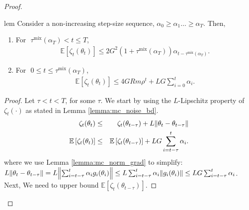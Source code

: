 \documentclass{colt2018} %
\DeclareMathOperator*{\mix}{mix}
\begin{document}
\begin{proof}
\begin{restatable}[]{lem}{}
Consider a non-increasing step-size sequence, $\alpha_0 \geq \alpha_1 \ldots \geq \alpha_T$. Then, 
\label{lemma:grad_bias_bd}
\begin{enumerate}[label=(\alph*)]
\item For $\,\,\tau^{\mix}(\alpha_T) < t \leq T$,
\begin{eqnarray*}
\mathbb{E}\left[\zeta_t(\theta_t)\right] \leq 2G^2 \left(1 + \tau^{\mix}(\alpha_T)\right) \alpha_{t-\tau^{\mix}(\alpha_T)}.
\end{eqnarray*}
\item For $\,\, 0 \leq t \leq \tau^{\mix}(\alpha_T)$,
\begin{eqnarray*}
\mathbb{E}\left[\zeta_t(\theta_t)\right] \leq 4GR m \rho^t + LG \sum_{i=0}^t \alpha_i.
\end{eqnarray*}
\end{enumerate}
\end{restatable}
\begin{proof}
Let $\tau < t < T$, for some $\tau$. We start by using the $L$-Lipschitz property of $\zeta_t(\cdot)$ as stated in Lemma \ref{lemma:mc_noise_bd}.
\begin{eqnarray}
\zeta_t(\theta_t) &\leq& \zeta_t(\theta_{t-\tau}) + L \norm{\theta_t - \theta_{t-\tau}} \nonumber \\
\mathbb{E}\left[\zeta_t(\theta_t)\right] &\leq& \mathbb{E} \left[\zeta_t(\theta_{t-\tau})\right] + LG \sum_{i=t-\tau}^t \alpha_i. \label{eq:mc_noise_rec}
\end{eqnarray}
where we use Lemma \ref{lemma:mc_norm_grad} to simplify: $L \norm{\theta_t - \theta_{t-\tau}} = L \norm{\sum_{i=t-\tau}^t \alpha_i g_i(\theta_i)} \leq L \sum_{i=t-\tau}^t \alpha_i \norm{g_i(\theta_i)} \leq LG \sum_{i=t-\tau}^t \alpha_i$. Next, We need to upper bound $\mathbb{E} \left[\zeta_t(\theta_{t-\tau})\right]$.


\end{proof}
\end{proof}
\end{document}

